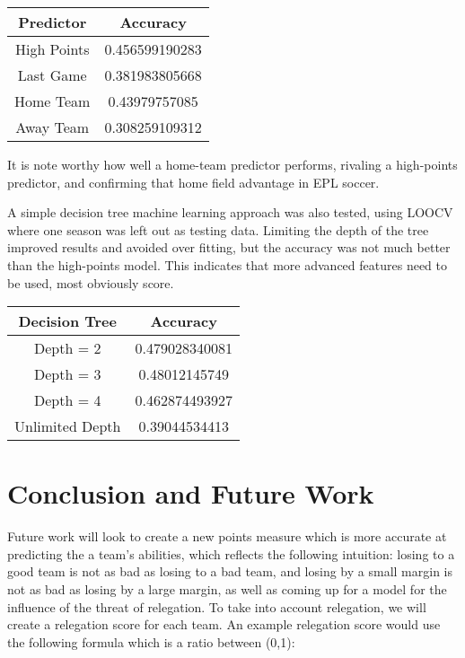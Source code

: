 \documentclass[conference]{IEEEtran}
\begin{document}
\begin{center}
  \begin{tabular}{@{} cc @{}}
    \hline
    Predictor & Accuracy \\ 
    \hline
High Points & 0.456599190283 \\ 
    Last Game & 0.381983805668\\ 
    Home Team & 0.43979757085 \\ 
    Away Team & 0.308259109312\\ 
    \hline
  \end{tabular}
\end{center}

It is note worthy how well a home-team predictor performs, rivaling a high-points predictor, and confirming that home field advantage in EPL soccer.

A simple decision tree machine learning approach was also tested, using LOOCV where one season was left out as testing data. Limiting the depth of the tree improved results and avoided over fitting, but the accuracy was not much better than the high-points model.  This indicates that more advanced features need to be used, most obviously score.

\begin{center}
  \begin{tabular}{@{} cc @{}}
    \hline
    Decision Tree & Accuracy \\ 
    \hline
Depth = 2 &0.479028340081\\ 
    Depth = 3 & 0.48012145749\\ 
   Depth = 4 & 0.462874493927 \\ 
    Unlimited Depth & 0.39044534413\\ 
    \hline
  \end{tabular}
\end{center}

\section{Conclusion and Future Work}
Future work will look to create a new points measure which is more accurate at predicting the a team's abilities, which reflects the following intuition: losing to a good team is not as bad as losing to a bad team, and losing by a small margin is not as bad as losing by a large margin, as well as coming up for a model for the influence of the threat of relegation. 
To take into account relegation, we will create a relegation score for each team. An example relegation score would use the following formula which is a ratio between (0,1): 
\end{document}
